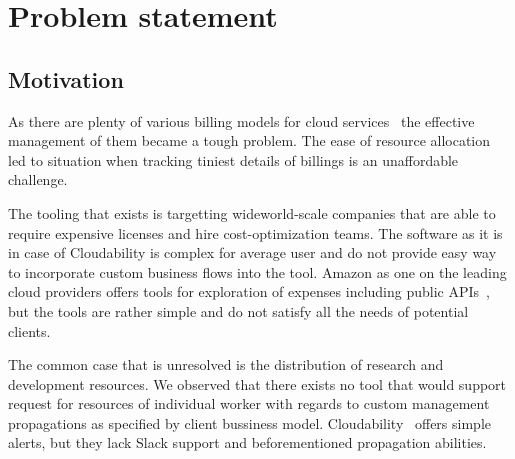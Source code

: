 \documentclass[licencjacka,en]{thesisclass}
\begin{document}

    \chapter{Problem statement}

    \section{Motivation}

    As there are plenty of various billing models for cloud services~\cite{GLaatikainen}
    the effective management of them became a tough problem.
    The ease of resource allocation led to situation when tracking tiniest details of billings is an unaffordable challenge.

    The tooling that exists is targetting wideworld-scale companies that are able to require expensive licenses and hire cost-optimization teams.
    The software as it is in case of Cloudability is complex for average user and do not provide easy way to incorporate custom business flows into the tool.
    Amazon as one on the leading cloud providers offers tools for exploration of expenses including public APIs~\cite{AWSCostManagement},
    but the tools are rather simple and do not satisfy all the needs of potential clients.

    The common case that is unresolved is the distribution of research and development resources.
    We observed that there exists no tool that would support request for resources of individual worker with regards to custom management propagations as specified by client bussiness model.
    Cloudability~\cite{CloudabilityAlerts} offers simple alerts, but they lack Slack support and beforementioned propagation abilities.
\end{document}

